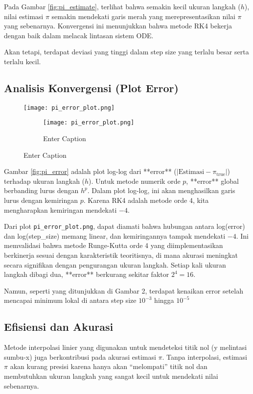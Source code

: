 \documentclass[conference]{IEEEtran}
\begin{document}
Pada Gambar \ref{fig:pi_estimate}, terlihat bahwa semakin kecil ukuran langkah ($h$), nilai estimasi $\pi$ semakin mendekati garis merah yang merepresentasikan nilai $\pi$ yang sebenarnya. Konvergensi ini menunjukkan bahwa metode RK4 bekerja dengan baik dalam melacak lintasan sistem ODE.

Akan tetapi, terdapat deviasi yang tinggi dalam step size yang terlalu besar serta terlalu kecil.

\subsection{Analisis Konvergensi (Plot Error)}

\begin{figure}[htbp]
\centerline{\texttt{[image: pi\_error\_plot.png]}}
\caption{Error Estimasi Pi vs Ukuran Langkah.}
\label{fig:pi_error}
\begin{figure}
    \centering
    \texttt{[image: pi\_error\_plot.png]}
    \caption{Enter Caption}
    \label{fig:enter-label}
\end{figure}
\end{figure}

Gambar \ref{fig:pi_error} adalah plot log-log dari **error** ($|\text{Estimasi} - \pi_{\text{true}}|$) terhadap ukuran langkah ($h$). Untuk metode numerik orde $p$, **error** global berbanding lurus dengan $h^p$. Dalam plot log-log, ini akan menghasilkan garis lurus dengan kemiringan $p$. Karena RK4 adalah metode orde 4, kita mengharapkan kemiringan mendekati $-4$.

Dari plot \texttt{pi\_error\_plot.png}, dapat diamati bahwa hubungan antara log(error) dan log(step\_size) memang linear, dan kemiringannya tampak mendekati $-4$. Ini memvalidasi bahwa metode Runge-Kutta orde 4 yang diimplementasikan berkinerja sesuai dengan karakteristik teoritisnya, di mana akurasi meningkat secara signifikan dengan pengurangan ukuran langkah. Setiap kali ukuran langkah dibagi dua, **error** berkurang sekitar faktor $2^4 = 16$.

Namun, seperti yang ditunjukkan di Gambar 2, terdapat kenaikan error setelah mencapai minimum lokal di antara step size $10^{-3}$ hingga $10^{-5}$

\subsection{Efisiensi dan Akurasi}
Metode interpolasi linier yang digunakan untuk mendeteksi titik nol (y melintasi sumbu-x) juga berkontribusi pada akurasi estimasi $\pi$. Tanpa interpolasi, estimasi $\pi$ akan kurang presisi karena hanya akan ``melompati'' titik nol dan membutuhkan ukuran langkah yang sangat kecil untuk mendekati nilai sebenarnya.
\end{document}
